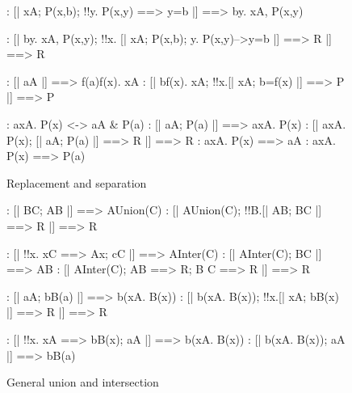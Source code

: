 \begin{figure}[p]
\begin{alltt*}\isastyleminor
{}:   [| x\isasymin{}A;  P(x,b);  !!y. P(x,y) ==> y=b |] ==> 
            b\isasymin{}{\ttlbrace}y. x\isasymin{}A, P(x,y){\ttrbrace}

:   [| b\isasymin{}{\ttlbrace}y. x\isasymin{}A, P(x,y){\ttrbrace};  
               !!x. [| x\isasymin{}A; P(x,b); {\isasymforall}y. P(x,y)-->y=b |] ==> R 
            |] ==> R

:    [| a\isasymin{}A |] ==> f(a)\isasymin{}{\ttlbrace}f(x). x\isasymin{}A{\ttrbrace}
:    [| b\isasymin{}{\ttlbrace}f(x). x\isasymin{}A{\ttrbrace};  
                !!x.[| x\isasymin{}A;  b=f(x) |] ==> P |] ==> P

:  a\isasymin{}{\ttlbrace}x\isasymin{}A. P(x){\ttrbrace} <-> a\isasymin{}A & P(a)
:    [| a\isasymin{}A;  P(a) |] ==> a\isasymin{}{\ttlbrace}x\isasymin{}A. P(x){\ttrbrace}
:    [| a\isasymin{}{\ttlbrace}x\isasymin{}A. P(x){\ttrbrace};  [| a\isasymin{}A; P(a) |] ==> R |] ==> R
:   a\isasymin{}{\ttlbrace}x\isasymin{}A. P(x){\ttrbrace} ==> a\isasymin{}A
:   a\isasymin{}{\ttlbrace}x\isasymin{}A. P(x){\ttrbrace} ==> P(a)
\end{alltt*}
\caption{Replacement and separation} \label{zf-lemmas2}
\end{figure}


\begin{figure}
\begin{alltt*}\isastyleminor
{}: [| B\isasymin{}C;  A\isasymin{}B |] ==> A\isasymin{}Union(C)
: [| A\isasymin{}Union(C);  !!B.[| A\isasymin{}B;  B\isasymin{}C |] ==> R |] ==> R

: [| !!x. x\isasymin{}C ==> A\isasymin{}x;  c\isasymin{}C |] ==> A\isasymin{}Inter(C)
: [| A\isasymin{}Inter(C);  B\isasymin{}C |] ==> A\isasymin{}B
: [| A\isasymin{}Inter(C);  A\isasymin{}B ==> R;  B \isasymnotin C ==> R |] ==> R

:   [| a\isasymin{}A;  b\isasymin{}B(a) |] ==> b\isasymin{}({\isasymUnion}x\isasymin{}A. B(x))
:   [| b\isasymin{}({\isasymUnion}x\isasymin{}A. B(x));  !!x.[| x\isasymin{}A;  b\isasymin{}B(x) |] ==> R 
           |] ==> R

:  [| !!x. x\isasymin{}A ==> b\isasymin{}B(x);  a\isasymin{}A |] ==> b\isasymin{}({\isasymInter}x\isasymin{}A. B(x))
:  [| b\isasymin{}({\isasymInter}x\isasymin{}A. B(x));  a\isasymin{}A |] ==> b\isasymin{}B(a)
\end{alltt*}
\caption{General union and intersection} \label{zf-lemmas3}
\end{figure}


